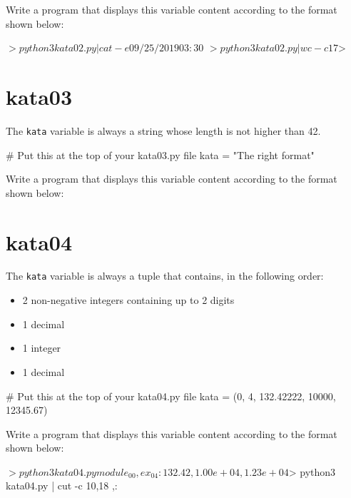 \documentclass{42-en}
\begin{document}
Write a program that displays this variable content according to the format shown below:

\begin{42console}
$> python3 kata02.py | cat -e
09/25/2019 03:30$
$> python3 kata02.py | wc -c
17
$>
\end{42console}

\section*{kata03}

The \texttt{kata} variable is always a string whose length is not higher than 42.

\begin{42console}
# Put this at the top of your kata03.py file
kata = "The right format"
\end{42console}

Write a program that displays this variable content according to the format shown below:


\section*{kata04}

The \texttt{kata} variable is always a tuple that contains, in the following order:
\begin{itemize}
	\item 2 non-negative integers containing up to 2 digits
	\item 1 decimal
	\item 1 integer
	\item 1 decimal
\end{itemize}

\begin{42console}
# Put this at the top of your kata04.py file
kata = (0, 4, 132.42222, 10000, 12345.67)
\end{42console}

Write a program that displays this variable content according to the format shown below:

\begin{42console}
$> python3 kata04.py
module_00, ex_04 : 132.42, 1.00e+04, 1.23e+04
$> python3 kata04.py | cut -c 10,18
,:
\end{42console}
\end{document}
